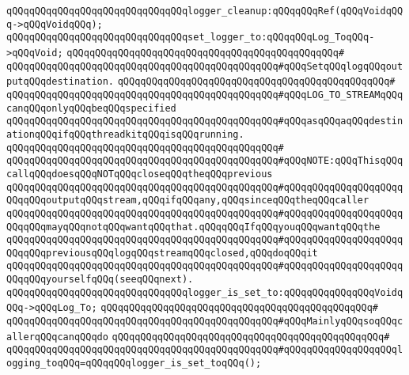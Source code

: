 \verb|qQQqqQQqqQQqqQQqqQQqqQQqqQQqqQQqlogger_cleanup:qQQqqQQqRef(qQQqVoidqQQq->qQQqVoidqQQq);|\newline
\newline
\verb|qQQqqQQqqQQqqQQqqQQqqQQqqQQqqQQqset_logger_to:qQQqqQQqLog_ToqQQq->qQQqVoid;|\newline
\verb|qQQqqQQqqQQqqQQqqQQqqQQqqQQqqQQqqQQqqQQqqQQqqQQq#|\newline
\verb|qQQqqQQqqQQqqQQqqQQqqQQqqQQqqQQqqQQqqQQqqQQqqQQq#qQQqSetqQQqlogqQQqoutputqQQqdestination.|\newline
\verb|qQQqqQQqqQQqqQQqqQQqqQQqqQQqqQQqqQQqqQQqqQQqqQQq#|\newline
\verb|qQQqqQQqqQQqqQQqqQQqqQQqqQQqqQQqqQQqqQQqqQQqqQQq#qQQqLOG_TO_STREAMqQQqcanqQQqonlyqQQqbeqQQqspecified|\newline
\verb|qQQqqQQqqQQqqQQqqQQqqQQqqQQqqQQqqQQqqQQqqQQqqQQq#qQQqasqQQqaqQQqdestinationqQQqifqQQqthreadkitqQQqisqQQqrunning.|\newline
\verb|qQQqqQQqqQQqqQQqqQQqqQQqqQQqqQQqqQQqqQQqqQQqqQQq#|\newline
\verb|qQQqqQQqqQQqqQQqqQQqqQQqqQQqqQQqqQQqqQQqqQQqqQQq#qQQqNOTE:qQQqThisqQQqcallqQQqdoesqQQqNOTqQQqcloseqQQqtheqQQqprevious|\newline
\verb|qQQqqQQqqQQqqQQqqQQqqQQqqQQqqQQqqQQqqQQqqQQqqQQq#qQQqqQQqqQQqqQQqqQQqqQQqqQQqoutputqQQqstream,qQQqifqQQqany,qQQqsinceqQQqtheqQQqcaller|\newline
\verb|qQQqqQQqqQQqqQQqqQQqqQQqqQQqqQQqqQQqqQQqqQQqqQQq#qQQqqQQqqQQqqQQqqQQqqQQqqQQqmayqQQqnotqQQqwantqQQqthat.qQQqqQQqIfqQQqyouqQQqwantqQQqthe|\newline
\verb|qQQqqQQqqQQqqQQqqQQqqQQqqQQqqQQqqQQqqQQqqQQqqQQq#qQQqqQQqqQQqqQQqqQQqqQQqqQQqpreviousqQQqlogqQQqstreamqQQqclosed,qQQqdoqQQqit|\newline
\verb|qQQqqQQqqQQqqQQqqQQqqQQqqQQqqQQqqQQqqQQqqQQqqQQq#qQQqqQQqqQQqqQQqqQQqqQQqqQQqyourselfqQQq(seeqQQqnext).|\newline
\newline
\verb|qQQqqQQqqQQqqQQqqQQqqQQqqQQqqQQqlogger_is_set_to:qQQqqQQqqQQqqQQqVoidqQQq->qQQqLog_To;|\newline
\verb|qQQqqQQqqQQqqQQqqQQqqQQqqQQqqQQqqQQqqQQqqQQqqQQq#|\newline
\verb|qQQqqQQqqQQqqQQqqQQqqQQqqQQqqQQqqQQqqQQqqQQqqQQq#qQQqMainlyqQQqsoqQQqcallerqQQqcanqQQqdo|\newline
\verb|qQQqqQQqqQQqqQQqqQQqqQQqqQQqqQQqqQQqqQQqqQQqqQQq#|\newline
\verb|qQQqqQQqqQQqqQQqqQQqqQQqqQQqqQQqqQQqqQQqqQQqqQQq#qQQqqQQqqQQqqQQqqQQqlogging_toqQQq=qQQqqQQqlogger_is_set_toqQQq();|\newline
